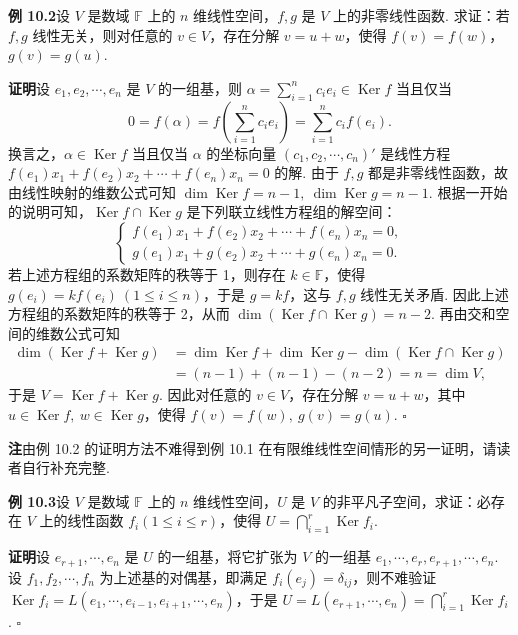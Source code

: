 \documentclass[UTF8,12pt,a4paper,fontset=fandol]{ctexart}
\begin{document}
\noindent\textbf{例 10.2}\quad 设 $V$ 是数域 $\mathbb{F}$ 上的 $n$ 维线性空间，$f,g$ 是 $V$ 上的非零线性函数. 求证：若 $f,g$ 线性无关，则对任意的 $v\in V$，存在分解 $v=u+w$，使得 $f(v)=f(w)$，$g(v)=g(u)$.

\noindent\textbf{证明}\quad 设 $e_1,e_2,\cdots,e_n$ 是 $V$ 的一组基，则 $\alpha=\sum_{i=1}^n c_ie_i\in\operatorname{Ker}f$ 当且仅当
\[
0=f(\alpha)=f\left(\sum_{i=1}^n c_ie_i\right)=\sum_{i=1}^n c_if(e_i).
\]
换言之，$\alpha\in\operatorname{Ker}f$ 当且仅当 $\alpha$ 的坐标向量 $(c_1,c_2,\cdots,c_n)'$ 是线性方程 $f(e_1)x_1+f(e_2)x_2+\cdots+f(e_n)x_n=0$ 的解. 由于 $f,g$ 都是非零线性函数，故由线性映射的维数公式可知 $\dim\operatorname{Ker}f=n-1,\ \dim\operatorname{Ker}g=n-1$. 根据一开始的说明可知，$\operatorname{Ker}f\cap\operatorname{Ker}g$ 是下列联立线性方程组的解空间：
\[
\left\{
\begin{array}{l}
f(e_1)x_1+f(e_2)x_2+\cdots+f(e_n)x_n=0,\\
g(e_1)x_1+g(e_2)x_2+\cdots+g(e_n)x_n=0.
\end{array}
\right.
\]
若上述方程组的系数矩阵的秩等于 1，则存在 $k\in\mathbb{F}$，使得 $g(e_i)=kf(e_i)\ (1\le i\le n)$，于是 $g=kf$，这与 $f,g$ 线性无关矛盾. 因此上述方程组的系数矩阵的秩等于 2，从而 $\dim(\operatorname{Ker}f\cap\operatorname{Ker}g)=n-2$. 再由交和空间的维数公式可知
\[
\begin{aligned}
\dim(\operatorname{Ker}f+\operatorname{Ker}g)
&=\dim\operatorname{Ker}f+\dim\operatorname{Ker}g-\dim(\operatorname{Ker}f\cap\operatorname{Ker}g)\\
&=(n-1)+(n-1)-(n-2)=n=\dim V,
\end{aligned}
\]
于是 $V=\operatorname{Ker}f+\operatorname{Ker}g$. 因此对任意的 $v\in V$，存在分解 $v=u+w$，其中 $u\in\operatorname{Ker}f,\ w\in\operatorname{Ker}g$，使得 $f(v)=f(w),\ g(v)=g(u)$. $\square$

\noindent\textbf{注}\quad 由例 10.2 的证明方法不难得到例 10.1 在有限维线性空间情形的另一证明，请读者自行补充完整.

\noindent\textbf{例 10.3}\quad 设 $V$ 是数域 $\mathbb{F}$ 上的 $n$ 维线性空间，$U$ 是 $V$ 的非平凡子空间，求证：必存在 $V$ 上的线性函数 $f_i(1\le i\le r)$，使得 $U=\bigcap_{i=1}^r\operatorname{Ker}f_i$.

\noindent\textbf{证明}\quad 设 $e_{r+1},\cdots,e_n$ 是 $U$ 的一组基，将它扩张为 $V$ 的一组基 $e_1,\cdots,e_r,e_{r+1},\cdots,e_n$. 设 $f_1,f_2,\cdots,f_n$ 为上述基的对偶基，即满足 $f_i(e_j)=\delta_{ij}$，则不难验证 $\operatorname{Ker}f_i=L(e_1,\cdots,e_{i-1},e_{i+1},\cdots,e_n)$，于是 $U=L(e_{r+1},\cdots,e_n)=\bigcap_{i=1}^r\operatorname{Ker}f_i$. $\square$
\end{document}
